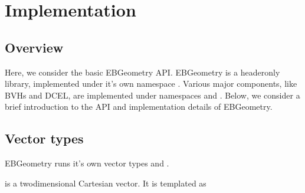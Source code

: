 \documentclass[letterpaper,10pt,english]{sphinxmanual}
\begin{document}
\chapter{Implementation}
\label{\detokenize{index:implementation}}
\sphinxstepscope


\section{Overview}
\label{\detokenize{Implementation:overview}}\label{\detokenize{Implementation:chap-implementation}}\label{\detokenize{Implementation::doc}}
\sphinxAtStartPar
Here, we consider the basic EBGeometry API.
EBGeometry is a header\sphinxhyphen{}only library, implemented under it’s own namespace .
Various major components, like BVHs and DCEL, are implemented under namespaces  and .
Below, we consider a brief introduction to the API and implementation details of EBGeometry.

\sphinxstepscope


\section{Vector types}
\label{\detokenize{ImplemVec:vector-types}}\label{\detokenize{ImplemVec:chap-vector}}\label{\detokenize{ImplemVec::doc}}
\sphinxAtStartPar
EBGeometry runs it’s own vector types  and .

\sphinxAtStartPar
{} is a two\sphinxhyphen{}dimensional Cartesian vector.
It is templated as

\begin{sphinxVerbatim}[commandchars=\\\{\}]
\end{sphinxVerbatim}
\end{document}

